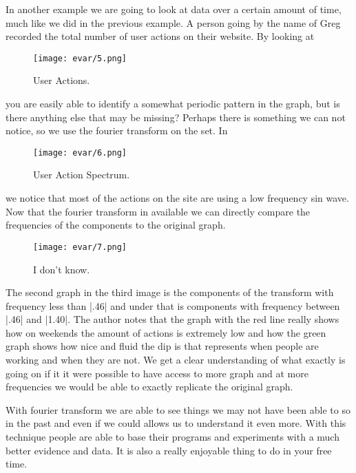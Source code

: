 \documentclass [../article.tex]{subfiles}
\begin{document}
	In another example we are going to look at data over a certain
  amount of time, much like we did in the previous example. A
  person going by the name of Greg recorded the total number of
  user actions on their website. By looking at
  \begin{figure}[H]
    \texttt{[image: evar/5.png]}
    \caption{User Actions.}
    \label{fig:useractions}
  \end{figure}
  you are easily able to identify a somewhat periodic pattern in
  the graph, but is there anything else that may be missing?
  Perhaps there is something we can not notice, so we use the
  fourier transform on the set. In
  \begin{figure}[H]
    \texttt{[image: evar/6.png]}
    \caption{User Action Spectrum.}
    \label{fig:actionspectrum}
  \end{figure}
  we notice that most of the actions on the site are using a low
  frequency sin wave. Now that the fourier transform in available
  we can directly compare the frequencies of the components to the
  original graph.
  \begin{figure}[H]
    \texttt{[image: evar/7.png]}
    \caption{I don't know.}
    \label{fig:idk}
  \end{figure}
  The second graph in the third image is the components of the
  transform with frequency less than |.46| and under that is
  components with frequency between |.46| and |1.40|.  The author
  notes that  the graph with the red line really shows how on
  weekends the amount of actions is extremely low and how the
  green graph shows how nice and fluid the dip is that represents
  when people are working and when they are not. We get a clear
  understanding of what exactly is going on if it it were possible
  to have access to more graph and at more frequencies we would be
  able to exactly replicate the original graph.

	With fourier transform we are able to see things we may not have
  been able to so in the past and even if we could allows us to
  understand it even more. With this technique people are able to
  base their programs and experiments with a much better evidence
  and data. It is also a really enjoyable thing to do in your free
  time.
\end{document}
